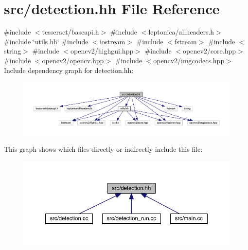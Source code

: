 \hypertarget{detection_8hh}{}\section{src/detection.hh File Reference}
\label{detection_8hh}
{\ttfamily \#include $<$tesseract/baseapi.\+h$>$}\newline
{\ttfamily \#include $<$leptonica/allheaders.\+h$>$}\newline
{\ttfamily \#include \char`\"{}utils.\+hh\char`\"{}}\newline
{\ttfamily \#include $<$iostream$>$}\newline
{\ttfamily \#include $<$fstream$>$}\newline
{\ttfamily \#include $<$string$>$}\newline
{\ttfamily \#include $<$opencv2/highgui.\+hpp$>$}\newline
{\ttfamily \#include $<$opencv2/core.\+hpp$>$}\newline
{\ttfamily \#include $<$opencv2/opencv.\+hpp$>$}\newline
{\ttfamily \#include $<$opencv2/imgcodecs.\+hpp$>$}\newline
Include dependency graph for detection.\+hh\+:
\nopagebreak
\begin{figure}[H]
\begin{center}
\leavevmode
\includegraphics[width=350pt]{detection_8hh__incl}
\end{center}
\end{figure}
This graph shows which files directly or indirectly include this file\+:
\nopagebreak
\begin{figure}[H]
\begin{center}
\leavevmode
\includegraphics[width=350pt]{detection_8hh__dep__incl}
\end{center}
\end{figure}
